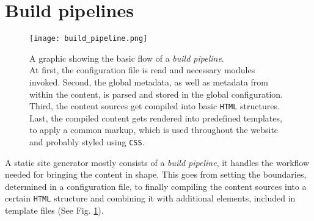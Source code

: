 \section{Build pipelines}
\label{sec:buildpipelines}

\begin{figure} %
    \centering
    \texttt{[image: build\_pipeline.png]}
    \caption{A graphic showing the basic flow of a \emph{build pipeline}.\\
    At first, the configuration file is read and necessary modules invoked. Second, the global metadata, as well as metadata from within the content, is parsed and stored in the global configuration. Third, the content sources get compiled into basic \texttt{HTML} structures. Last, the compiled content gets rendered into predefined templates, to apply a common markup, which is used throughout the website and probably styled using \texttt{CSS}.}
    \label{fig:build-pipeline}
\end{figure}
%

A static site generator mostly consists of a \emph{build pipeline}, it handles the workflow needed for bringing the content in shape. This goes from setting the boundaries, determined in a configuration file, to finally compiling the content sources into a certain \texttt{HTML} structure and combining it with additional elements, included in template files (See Fig. \ref{fig:build-pipeline}).
